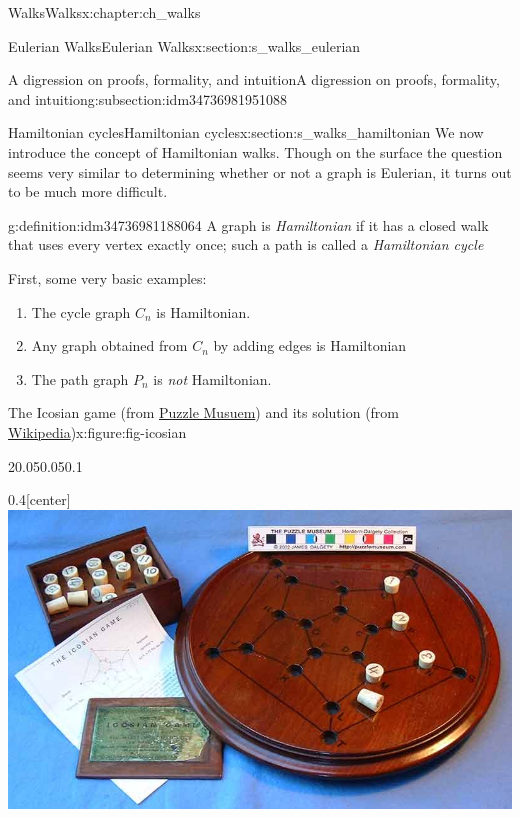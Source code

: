 \documentclass[oneside,10pt,]{book}
\numberwithin{equation}{section}
\begin{document}
\begin{chapterptx}{Walks}{}{Walks}{}{}{x:chapter:ch_walks}
\begin{sectionptx}{Eulerian Walks}{}{Eulerian Walks}{}{}{x:section:s_walks_eulerian}
\begin{subsectionptx}{A digression on proofs, formality, and intuition}{}{A digression on proofs, formality, and intuition}{}{}{g:subsection:idm34736981951088}
\end{subsectionptx}
\end{sectionptx}
%
%
\typeout{************************************************}
\typeout{************************************************}
%
\begin{sectionptx}{Hamiltonian cycles}{}{Hamiltonian cycles}{}{}{x:section:s_walks_hamiltonian}
We now introduce the concept of Hamiltonian walks. Though on the surface the question seems very similar to determining whether or not a graph is Eulerian, it turns out to be much more difficult.%
\begin{definition}{}{g:definition:idm34736981188064}%
A graph is \emph{Hamiltonian} if it has a closed walk that uses every vertex exactly once; such a path is called a \emph{Hamiltonian cycle}%
\end{definition}
First, some very basic examples:%
%
\begin{enumerate}
\item{}The cycle graph \(C_n\) is Hamiltonian.%
\item{}Any graph obtained from \(C_n\) by adding edges is Hamiltonian%
\item{}The path graph \(P_n\) is \emph{not} Hamiltonian.%
\end{enumerate}
\begin{figureptx}{The Icosian game (from \href{https://www.puzzlemuseum.com/month/picm02/200207icosian.htm}{Puzzle Musuem}) and its solution (from \href{https://en.wikipedia.org/wiki/Icosian_game}{Wikipedia})}{x:figure:fig-icosian}{}%
\centering
\begin{sidebyside}{2}{0.05}{0.05}{0.1}%
\begin{sbspanel}{0.4}[center]%
\includegraphics[width=\linewidth]{images/icosiangame.jpg}

\end{sbspanel}
\end{sidebyside}
\end{figureptx}
\end{sectionptx}
\end{chapterptx}
\end{document}
